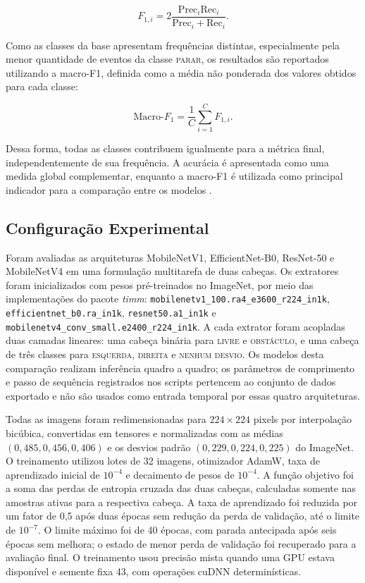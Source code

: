 \documentclass[conference]{IEEEtran}
\begin{document}
\begin{equation}
F_{1,i} =
2\frac{\mathrm{Prec}_{i}\mathrm{Rec}_{i}}
{\mathrm{Prec}_{i}+\mathrm{Rec}_{i}}.
\label{eq:f1_class}
\end{equation}

Como as classes da base apresentam frequências distintas, especialmente pela menor quantidade de eventos da classe \textsc{parar}, os resultados são reportados utilizando a macro-F1, definida como a média não ponderada dos valores obtidos para cada classe:

\begin{equation}
\mathrm{Macro}\text{-}F_{1} =
\frac{1}{C}\sum_{i=1}^{C}F_{1,i}.
\label{eq:macro_f1}
\end{equation}

Dessa forma, todas as classes contribuem igualmente para a métrica final, independentemente de sua frequência. A acurácia é apresentada como uma medida global complementar, enquanto a macro-F1 é utilizada como principal indicador para a comparação entre os modelos \cite{farhadpour2024metrics}.

\subsection{Configuração Experimental}

Foram avaliadas as arquiteturas MobileNetV1, EfficientNet-B0, ResNet-50 e
MobileNetV4 em uma formulação multitarefa de duas cabeças. Os extratores foram
inicializados com pesos pré-treinados no ImageNet, por meio das implementações
do pacote \textit{timm}: \texttt{mobilenetv1\_100.ra4\_e3600\_r224\_in1k},
\texttt{efficientnet\_b0.ra\_in1k}, \texttt{resnet50.a1\_in1k} e
\texttt{mobilenetv4\_conv\_small.e2400\_r224\_in1k}. A cada extrator foram
acopladas duas camadas lineares: uma cabeça binária para \textsc{livre} e
\textsc{obstáculo}, e uma cabeça de três classes para \textsc{esquerda},
\textsc{direita} e \textsc{nenhum desvio}. Os modelos desta comparação
realizam inferência quadro a quadro; os parâmetros de comprimento e passo de
sequência registrados nos scripts pertencem ao conjunto de dados exportado e
não são usados como entrada temporal por essas quatro arquiteturas.

Todas as imagens foram redimensionadas para $224\times224$ pixels por
interpolação bicúbica, convertidas em tensores e normalizadas com as médias
$(0{,}485, 0{,}456, 0{,}406)$ e os desvios padrão
$(0{,}229, 0{,}224, 0{,}225)$ do ImageNet. O treinamento utilizou lotes de
32 imagens, otimizador AdamW, taxa de aprendizado inicial de $10^{-4}$ e
decaimento de pesos de $10^{-4}$. A função objetivo foi a soma das perdas de
entropia cruzada das duas cabeças, calculadas somente nas amostras ativas para
a respectiva cabeça. A taxa de aprendizado foi reduzida por um fator de 0,5
após duas épocas sem redução da perda de validação, até o limite de $10^{-7}$.
O limite máximo foi de 40 épocas, com parada antecipada após seis épocas sem
melhora; o estado de menor perda de validação foi recuperado para a avaliação
final. O treinamento usou precisão mista quando uma GPU estava disponível e
semente fixa 43, com operações cuDNN determinísticas.
\end{document}
